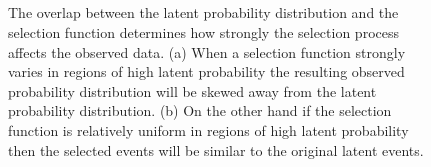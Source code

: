 \documentclass[
  letterpaper,
  DIV=11,
  numbers=noendperiod]{scrartcl}
\begin{document}
\begin{figure}

\begin{minipage}{0.05\linewidth}
~\end{minipage}%
%
\begin{minipage}{0.90\linewidth}


\subcaption{\label{fig-strong-selection}}

\end{minipage}%
%
\begin{minipage}{0.05\linewidth}
~\end{minipage}%
\newline
\begin{minipage}{0.05\linewidth}
~\end{minipage}%
%
\begin{minipage}{0.90\linewidth}


\subcaption{\label{fig-weak-selection}}

\end{minipage}%
%
\begin{minipage}{0.05\linewidth}
~\end{minipage}%

\caption{\label{fig-selection-strength}The overlap between the latent
probability distribution and the selection function determines how
strongly the selection process affects the observed data. (a) When a
selection function strongly varies in regions of high latent probability
the resulting observed probability distribution will be skewed away from
the latent probability distribution. (b) On the other hand if the
selection function is relatively uniform in regions of high latent
probability then the selected events will be similar to the original
latent events.}

\end{figure}%
\end{document}
